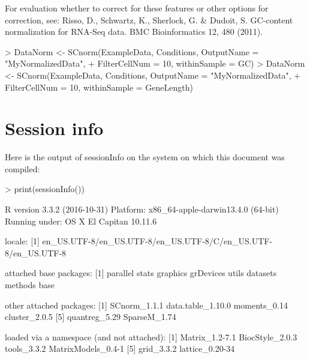 \documentclass{article}
\begin{document}
For evaluation whether to correct for these features or other options for correction, see: Risso, D., Schwartz, K., Sherlock, G. \& Dudoit, S. GC-content normalization for RNA-Seq data. BMC Bioinformatics 12, 480 (2011).

\begin{Schunk}
\begin{Sinput}
> DataNorm <- SCnorm(ExampleData, Conditions, OutputName = "MyNormalizedData",
+                      FilterCellNum = 10, withinSample = GC)
> DataNorm <- SCnorm(ExampleData, Conditions, OutputName = "MyNormalizedData",
+                      FilterCellNum = 10, withinSample = GeneLength)
\end{Sinput}
\end{Schunk}




\section{Session info}
Here is the output of sessionInfo on the system on which this document was compiled:
\begin{Schunk}
\begin{Sinput}
>   print(sessionInfo())
\end{Sinput}
\begin{Soutput}
R version 3.3.2 (2016-10-31)
Platform: x86_64-apple-darwin13.4.0 (64-bit)
Running under: OS X El Capitan 10.11.6

locale:
[1] en_US.UTF-8/en_US.UTF-8/en_US.UTF-8/C/en_US.UTF-8/en_US.UTF-8

attached base packages:
[1] parallel  stats     graphics  grDevices utils     datasets  methods   base     

other attached packages:
[1] SCnorm_1.1.1      data.table_1.10.0 moments_0.14      cluster_2.0.5    
[5] quantreg_5.29     SparseM_1.74     

loaded via a namespace (and not attached):
[1] Matrix_1.2-7.1     BiocStyle_2.0.3    tools_3.3.2        MatrixModels_0.4-1
[5] grid_3.3.2         lattice_0.20-34   
\end{Soutput}
\end{Schunk}
  
  \vspace{1cm}
%


%
\end{document}
